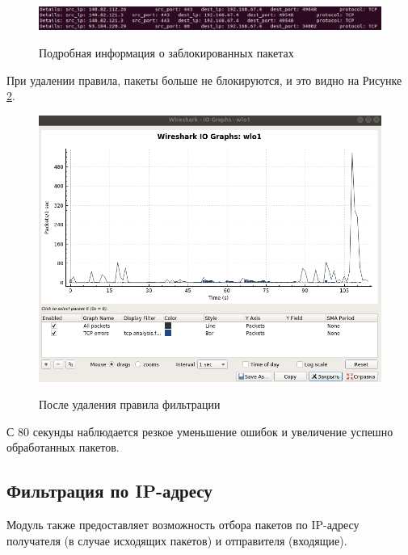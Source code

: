 \begin{figure}[h]
	\begin{center}
		{\includegraphics[scale = 0.6]{img/screenshots/rule_protocol/log_drop_packets.png}}
		\caption{Подробная информация о заблокированных пакетах}
		\label{fig44:image}
	\end{center}
\end{figure}

\newpage

При удалении правила, пакеты больше не блокируются, и это видно на Рисунке \ref{fig45:image}.
\begin{figure}[h!]
	\begin{center}
		{\includegraphics[scale = 0.5]{img/screenshots/rule_protocol/3_rule_protocol.png}}
		\caption{После удаления правила фильтрации}
		\label{fig45:image}
	\end{center}
\end{figure}

\newpage

С 80 секунды наблюдается резкое уменьшение ошибок и увеличение успешно обработанных пакетов. \newline

\subsection{Фильтрация по IP-адресу}
Модуль также предоставляет возможность отбора пакетов по IP-адресу получателя (в случае исходящих пакетов) и отправителя (входящие). 

